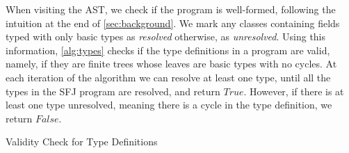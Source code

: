 \documentclass[runningheads]{llncs}
\begin{document}
When visiting the AST, we check if the program is well-formed, following the intuition at the end of \autoref{sec:background}.
We mark any classes containing fields typed with only basic types as \emph{resolved} otherwise, as \emph{unresolved}.
Using this information, \autoref{alg:types} checks if the type definitions in a program are valid, namely, if they are finite trees whose leaves are basic types with no cycles.
%
At each iteration of the algorithm we can resolve at least one type, until all the types in the SFJ program are resolved, and return $True$.
However, if there is at least one type unresolved, meaning there is a cycle in the type definition, we return $False$.

\begin{algorithm}[t]
    \SetAlgoLined
    \caption{Validity Check for Type Definitions}
    \label{alg:types}

    \DontPrintSemicolon
    \BlankLine
\end{algorithm}
\end{document}
